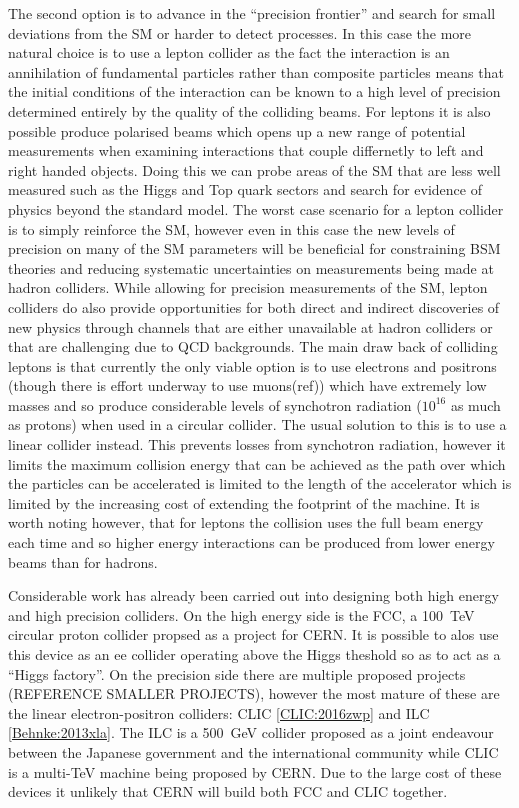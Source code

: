 The second option is to advance in the ``precision frontier'' and search for small deviations from the \ac{SM} or harder to detect processes. In this case the more natural choice is to use a lepton collider as the fact the interaction is an annihilation of fundamental particles rather than composite particles means that the initial conditions of the interaction can be known to a high level of precision determined entirely by the quality of the colliding beams. For leptons it is also possible produce polarised beams which opens up a new range of potential measurements when examining interactions that couple differnetly to left and right handed objects. Doing this we can probe areas of the \ac{SM} that are less well measured such as the Higgs and Top quark sectors and search for evidence of physics beyond the standard model. The worst case scenario for a lepton collider is to simply reinforce the \ac{SM}, however even in this case the new levels of precision on many of the \ac{SM} parameters will be beneficial for constraining \ac{BSM} theories and reducing systematic uncertainties on measurements being made at hadron colliders. While allowing for precision measurements of the \ac{SM}, lepton colliders do also provide opportunities for both direct and indirect discoveries of new physics through channels that are either unavailable at hadron colliders or that are challenging due to \ac{QCD} backgrounds. The main draw back of colliding leptons is that currently the only viable option is to use electrons and positrons (though there is effort underway to use muons(ref)) which have extremely low masses and so produce considerable levels of synchotron radiation (${10^{16}}$ as much as protons) when used in a circular collider. The usual solution to this is to use a linear collider instead. This prevents losses from synchotron radiation, however it limits the maximum collision energy that can be achieved as the path over which the particles can be accelerated is limited to the length of the accelerator which is limited by the increasing cost of extending the footprint of the machine. It is worth noting however, that for leptons the collision uses the full beam energy each time and so higher energy interactions can be produced from lower energy beams than for hadrons.

Considerable work has already been carried out into designing both high energy and high precision colliders. On the high energy side is the \ac{FCC}, a 100~TeV circular proton collider propsed as a project for CERN. It is possible to alos use this device as an ee collider operating above the Higgs theshold so as to act as a ``Higgs factory''. On the precision side there are multiple proposed projects (REFERENCE SMALLER PROJECTS), however the most mature of these are the linear electron-positron colliders: \ac{CLIC} \ref{CLIC:2016zwp} and \ac{ILC} \ref{Behnke:2013xla}. The \ac{ILC} is a 500~GeV collider proposed as a joint endeavour between the Japanese government and the international community while \ac{CLIC} is a multi-TeV machine being proposed by CERN. Due to the large cost of these devices it unlikely that CERN will build both \ac{FCC} and \ac{CLIC} together.

